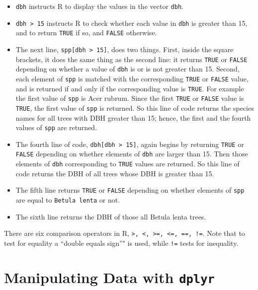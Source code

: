\documentclass[]{krantz}
\providecommand{\tightlist}{%
  \setlength{\itemsep}{0pt}\setlength{\parskip}{0pt}}
\begin{document}
\begin{itemize}
\tightlist
\item
  \texttt{dbh} instructs R to display the values in the vector \texttt{dbh}.
\item
  \texttt{dbh\ \textgreater{}\ 15} instructs R to check whether each value in \texttt{dbh} is greater than 15, and to return \texttt{TRUE} if so, and \texttt{FALSE} otherwise.
\item
  The next line, \texttt{spp{[}dbh\ \textgreater{}\ 15{]}}, does two things. First, inside the square brackets, it does the same thing as the second line: it returns \texttt{TRUE} or \texttt{FALSE} depending on whether a value of \texttt{dbh} is or is not greater than 15. Second, each element of \texttt{spp} is matched with the corresponding \texttt{TRUE} or \texttt{FALSE} value, and is returned if and only if the corresponding value is \texttt{TRUE}. For example the first value of \texttt{spp} is Acer rubrum. Since the first \texttt{TRUE} or \texttt{FALSE} value is \texttt{TRUE}, the first value of \texttt{spp} is returned. So this line of code returns the species names for all trees with DBH greater than 15; hence, the first and the fourth values of \texttt{spp} are returned.
\item
  The fourth line of code, \texttt{dbh{[}dbh\ \textgreater{}\ 15{]}}, again begins by returning \texttt{TRUE} or \texttt{FALSE} depending on whether elements of \texttt{dbh} are larger than 15. Then those elements of \texttt{dbh} corresponding to \texttt{TRUE} values are returned. So this line of code returns the DBH of all trees whose DBH is greater than 15.
\item
  The fifth line returns \texttt{TRUE} or \texttt{FALSE} depending on whether elements of \texttt{spp} are equal to \texttt{Betula\ lenta} or not.
\item
  The sixth line returns the DBH of those all Betula lenta trees.
\end{itemize}

There are six comparison operators in R, \texttt{\textgreater{},\ \textless{},\ \textgreater{}=,\ \textless{}=,\ ==,\ !=}. Note that to test for equality a ``double equals sign''" is used, while \texttt{!=} tests for inequality.

\hypertarget{manipulating-data-with-dplyr}{%
\chapter{\texorpdfstring{Manipulating Data with \texttt{dplyr}}{Manipulating Data with dplyr}}\label{manipulating-data-with-dplyr}}
\end{document}
